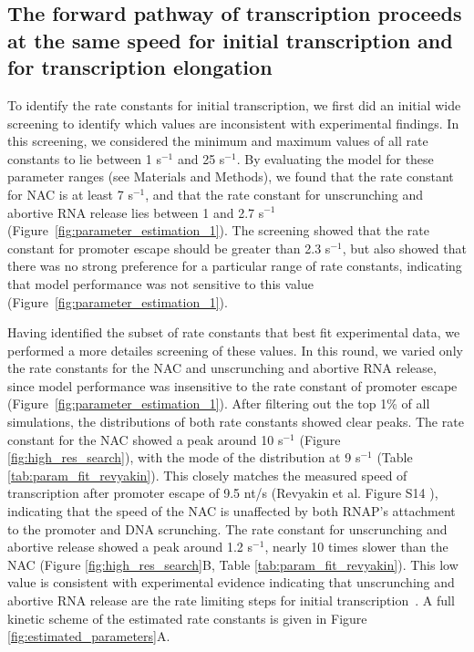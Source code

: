 %
\subsection{The forward pathway of transcription proceeds at the same speed
for initial transcription and for transcription elongation}

To identify the rate constants for initial transcription, we first did an
initial wide screening to identify which values are inconsistent with experimental
findings. In this screening, we considered the minimum and maximum values of
all rate constants to lie between 1 s$^{-1}$ and 25 s$^{-1}$. By evaluating
the model for these parameter ranges (see Materials and Methods), we found
that the rate constant for NAC is at least 7 s$^{-1}$, and that the rate
constant for unscrunching and abortive RNA release lies between 1 and 2.7
s$^{-1}$ (Figure~\ref{fig:parameter_estimation_1}). The screening showed that
the rate constant for promoter escape should be greater than 2.3 s$^{-1}$, but
also showed that there was no strong preference for a particular range of
rate constants, indicating that model performance was not sensitive to this
value (Figure~\ref{fig:parameter_estimation_1}).

Having identified the subset of rate constants that best fit experimental
data, we performed a more detailes screening of these values. In this round,
we varied only the rate constants for the NAC and unscrunching and abortive
RNA release, since model performance was insensitive to the rate constant of
promoter escape (Figure~\ref{fig:parameter_estimation_1}). After filtering out
the top 1\% of all simulations, the distributions of both rate constants
showed clear peaks. The rate constant for the NAC showed a peak around 10
s$^{-1}$ (Figure \ref{fig:high_res_search}), with the mode of the distribution
at 9 s$^{-1}$ (Table \ref{tab:param_fit_revyakin}). This closely matches the measured
speed of transcription after promoter escape of 9.5 nt/s (Revyakin et
al. Figure S14 \cite{revyakin_abortive_2006}), indicating that the speed of
the NAC is unaffected by both RNAP's attachment to the promoter and DNA
scrunching. The rate constant for unscrunching and abortive release showed a
peak around 1.2 s$^{-1}$, nearly 10 times slower than the NAC (Figure
\ref{fig:high_res_search}B, Table \ref{tab:param_fit_revyakin}). This low
value is consistent with experimental evidence indicating that unscrunching
and abortive RNA release are the rate limiting steps for initial
transcription~\cite{margeat_direct_2006, revyakin_abortive_2006}. A full
kinetic scheme of the estimated rate constants is given in Figure
\ref{fig:estimated_parameters}A.

